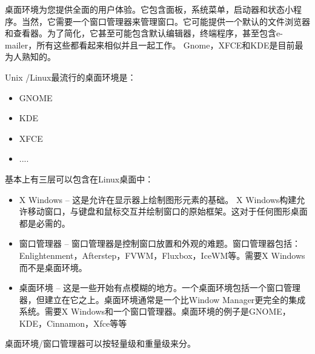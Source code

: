 \documentclass[utf8]{book}
\begin{document}
	桌面环境为您提供全面的用户体验。它包含面板，系统菜单，启动器和状态小程序。当然，它需要一个窗口管理器来管理窗口。它可能提供一个默认的文件浏览器和查看器。为了简化，它甚至可能包含默认编辑器，终端程序，甚至包含e-mailer，所有这些都看起来相似并且一起工作。 Gnome，XFCE和KDE是目前最为人熟知的。
	
	Unix /Linux最流行的桌面环境是：
	\begin{itemize}
		\item GNOME
		\item KDE
		\item XFCE
		\item ....
	\end{itemize}

     基本上有三层可以包含在Linux桌面中：
     \begin{itemize}
     	\item X Windows – 这是允许在显示器上绘制图形元素的基础。 X Windows构建允许移动窗口，与键盘和鼠标交互并绘制窗口的原始框架。这对于任何图形桌面都是必需的。
     	
     	\item 窗口管理器 – 窗口管理器是控制窗口放置和外观的难题。窗口管理器包括：Enlightenment，Afterstep，FVWM，Fluxbox，IceWM等。需要X Windows而不是桌面环境。
     	\item 桌面环境 – 这是一些开始有点模糊的地方。一个桌面环境包括一个窗口管理器，但建立在它之上。桌面环境通常是一个比Window Manager更完全的集成系统。需要X Windows和一个窗口管理器。桌面环境的例子是GNOME，KDE，Cinnamon，Xfce等等
     \end{itemize}



 	
	桌面环境/窗口管理器可以按轻量级和重量级来分。
	
\end{document}

